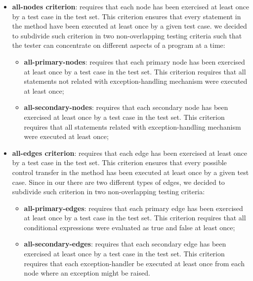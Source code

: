 \begin{itemize}
    \item \textbf{all-nodes criterion}: requires that each \BG node has been
    exercised at least once by a test case in the test set. This criterion
    ensures that every statement in the method have been executed
    at least once by a given test case. we decided
    to subdivide such criterion in two non-overlapping testing
    criteria such that the tester can concentrate on different
    aspects of a program at a time:

    \begin{itemize}
        \item \textbf{all-primary-nodes}: requires that each primary
        node has been exercised at least once by a test case in the
        test set. This criterion requires that all statements not related
        with exception-handling mechanism were executed at least once;

        \item \textbf{all-secondary-nodes}: requires that each
        secondary node has been exercised at least once by a test case in the
        test set. This criterion requires that all statements related
        with exception-handling mechanism were executed at least once;
    \end{itemize}


    \item \textbf{all-edges criterion}: requires that each \BG edge
    has been exercised at least once by a test case in the test set.
    This criterion ensures that every possible control transfer in
    the method
    has been executed at least once by a given test case. Since
    in our \BG there are two different types of edges, we decided
    to subdivide such criterion in two non-overlapping testing
    criteria:

    \begin{itemize}
        \item \textbf{all-primary-edges}: requires that each primary
        edge has been exercised at least once by a test case in the
        test set. This criterion requires that all conditional
        expressions were evaluated as true and false at least once;

        \item \textbf{all-secondary-edges}: requires that each
        secondary edge
        has been exercised at least once by a test case
        in the test set. This criterion requires that each
        exception-handler be executed at least once from each node
        where an exception might be raised.
    \end{itemize}
\end{itemize}


